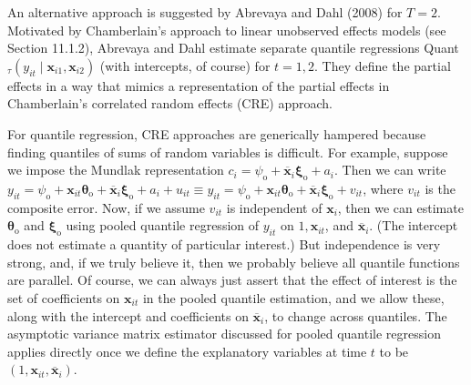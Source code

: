 \documentclass[10pt]{article}
\begin{document}
An alternative approach is suggested by Abrevaya and Dahl (2008) for $T=2$. Motivated by Chamberlain's approach to linear unobserved effects models (see Section 11.1.2), Abrevaya and Dahl estimate separate quantile regressions Quant $_{\tau}\left(y_{i t} \mid \mathbf{x}_{i 1}, \mathbf{x}_{i 2}\right)$ (with intercepts, of course) for $t=1,2$. They define the partial\\
effects in a way that mimics a representation of the partial effects in Chamberlain's correlated random effects (CRE) approach.

For quantile regression, CRE approaches are generically hampered because finding quantiles of sums of random variables is difficult. For example, suppose we impose the Mundlak representation $c_{i}=\psi_{\mathrm{o}}+\overline{\mathbf{x}}_{i} \boldsymbol{\xi}_{\mathrm{o}}+a_{i}$. Then we can write $y_{i t}= \psi_{\mathrm{o}}+\mathbf{x}_{i t} \boldsymbol{\theta}_{\mathrm{o}}+\overline{\mathbf{x}}_{i} \boldsymbol{\xi}_{\mathrm{o}}+a_{i}+u_{i t} \equiv y_{i t}=\psi_{\mathrm{o}}+\mathbf{x}_{i t} \boldsymbol{\theta}_{\mathrm{o}}+\overline{\mathbf{x}}_{i} \boldsymbol{\xi}_{\mathrm{o}}+v_{i t}$, where $v_{i t}$ is the composite error. Now, if we assume $v_{i t}$ is independent of $\mathbf{x}_{i}$, then we can estimate $\boldsymbol{\theta}_{\mathrm{o}}$ and $\boldsymbol{\xi}_{\mathrm{o}}$ using pooled quantile regression of $y_{i t}$ on $1, \mathbf{x}_{i t}$, and $\overline{\mathbf{x}}_{i}$. (The intercept does not estimate a quantity of particular interest.) But independence is very strong, and, if we truly believe it, then we probably believe all quantile functions are parallel. Of course, we can always just assert that the effect of interest is the set of coefficients on $\mathbf{x}_{i t}$ in the pooled quantile estimation, and we allow these, along with the intercept and coefficients on $\overline{\mathbf{x}}_{i}$, to change across quantiles. The asymptotic variance matrix estimator discussed for pooled quantile regression applies directly once we define the explanatory variables at time $t$ to be $\left(1, \mathbf{x}_{i t}, \overline{\mathbf{x}}_{i}\right)$.
\end{document}
